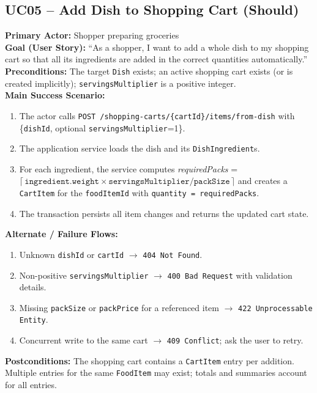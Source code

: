 \documentclass[11pt]{article}
\begin{document}
\subsection*{UC05 -- Add Dish to Shopping Cart (Should)}
\textbf{Primary Actor:} Shopper preparing groceries\\
\textbf{Goal (User Story):} ``As a shopper, I want to add a whole dish to my shopping cart so that all its ingredients are added in the correct quantities automatically.''\\
\textbf{Preconditions:} The target \texttt{Dish} exists; an active shopping cart exists (or is created implicitly); \texttt{servingsMultiplier} is a positive integer.\\
\textbf{Main Success Scenario:}
\begin{enumerate}[label=\arabic*.]
  \item The actor calls \texttt{POST /shopping-carts/\{cartId\}/items/from-dish} with \{\texttt{dishId}, optional \texttt{servingsMultiplier}=1\}.
  \item The application service loads the dish and its \texttt{DishIngredient}s.
  \item For each ingredient, the service computes \textit{requiredPacks} = \newline \(\lceil\,\texttt{ingredient.weight} \times \texttt{servingsMultiplier} / \texttt{packSize}\,\rceil\) and creates a \texttt{CartItem} for the \texttt{foodItemId} with \texttt{quantity = requiredPacks}.
  \item The transaction persists all item changes and returns the updated cart state.
\end{enumerate}
\textbf{Alternate / Failure Flows:}
\begin{enumerate}[label=\arabic*F.]
  \item Unknown \texttt{dishId} or \texttt{cartId} $\rightarrow$ \texttt{404 Not Found}.
  \item Non-positive \texttt{servingsMultiplier} $\rightarrow$ \texttt{400 Bad Request} with validation details.
  \item Missing \texttt{packSize} or \texttt{packPrice} for a referenced item $\rightarrow$ \texttt{422 Unprocessable Entity}.
  \item Concurrent write to the same cart $\rightarrow$ \texttt{409 Conflict}; ask the user to retry.
\end{enumerate}
\textbf{Postconditions:} The shopping cart contains a \texttt{CartItem} entry per addition. Multiple entries for the same \texttt{FoodItem} may exist; totals and summaries account for all entries.\\
\end{document}
